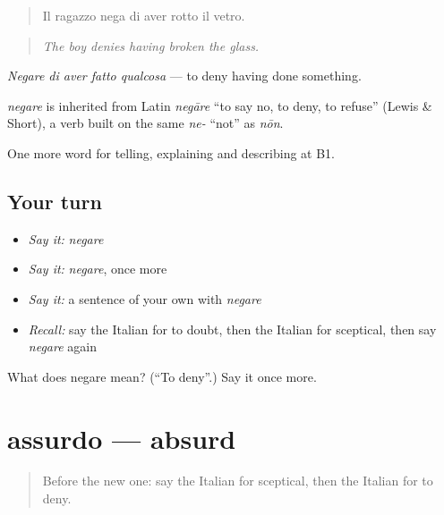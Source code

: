 \begin{quote}
Il ragazzo nega di aver rotto il vetro.
\end{quote}

\begin{quote}
\emph{The boy denies having broken the glass.}
\end{quote}

\emph{Negare di aver fatto qualcosa} — to deny having done something.

\begin{cousinweb}
\emph{negare} is inherited from Latin \emph{negāre} \textquotedblleft{}to say no, to deny, to refuse\textquotedblright{} (Lewis \& Short), a verb built on the same \emph{ne-} \textquotedblleft{}not\textquotedblright{} as \emph{nōn}.
\end{cousinweb}

\begin{grammarlens}[title={What you've built}]
One more word for telling, explaining and describing at B1.
\end{grammarlens}

\subsection*{Your turn}
\begin{itemize}
\raggedright
  \item \emph{Say it:} \emph{negare}
  \item \emph{Say it:} \emph{negare}, once more
  \item \emph{Say it:} a sentence of your own with \emph{negare}
  \item \emph{Recall:} say the Italian for to doubt, then the Italian for sceptical, then say \emph{negare} again
\end{itemize}

\begin{tcolorbox}[breakable,colback=teal!4,colframe=teal!35!black,title={Before you move on}]
What does negare mean? (\textquotedblleft{}To deny\textquotedblright{}.) Say it once more.
\end{tcolorbox}
\section[assurdo]{assurdo — absurd}

\label{lesson:IT-C343-assurdo}



\begin{quote}
Before the new one: say the Italian for sceptical, then the Italian for to deny.
\end{quote}

